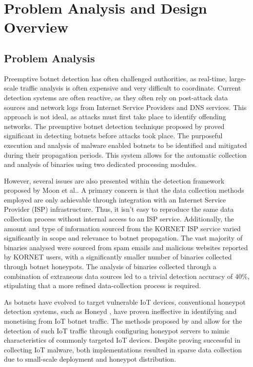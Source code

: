 
\chapter{Problem Analysis and Design Overview}

\section{Problem Analysis}

Preemptive botnet detection has often challenged authorities, as real-time, large-scale traffic analysis is often expensive and very difficult to coordinate. Current detection systems are often reactive, as they often rely on post-attack data sources and network logs from Internet Service Providers and DNS services. This approach is not ideal, as attacks must first take place to identify offending networks. The preemptive botnet detection technique proposed by \citet{Moon2012} proved significant in detecting botnets before attacks took place. The purposeful execution and analysis of malware enabled botnets to be identified and mitigated during their propagation periods. This system allows for the automatic collection and analysis of binaries using two dedicated processing modules. 

However, several issues are also presented within the detection framework proposed by Moon et al.. A primary concern is that the data collection methods employed are only achievable through integration with an Internet Service Provider (ISP) infrastructure. Thus, it isn't easy to reproduce the same data collection process without internal access to an ISP service. Additionally, the amount and type of information sourced from the KORNET ISP service varied significantly in scope and relevance to botnet propagation. The vast majority of binaries analysed were sourced from spam emails and malicious websites reported by KORNET users, with a significantly smaller number of binaries collected through botnet honeypots. The analysis of binaries collected through a combination of extraneous data sources led to a trivial detection accuracy of 40\%, stipulating that a more refined data-collection process is required.

As botnets have evolved to target vulnerable IoT devices, conventional honeypot detection systems, such as Honeyd \citep{Honeyd2008}, have proven ineffective in identifying and monetising from IoT botnet traffic. The methods proposed by \citep{PaPa2016} and \citep{Antonakakis2017} allow for the detection of such IoT traffic through configuring honeypot servers to mimic characteristics of commonly targeted IoT devices. Despite proving successful in collecting IoT malware, both implementations resulted in sparse data collection due to small-scale deployment and honeypot distribution. 

